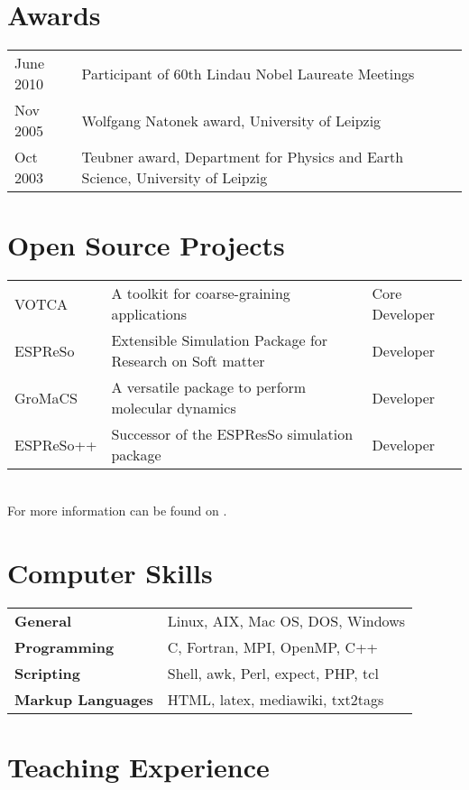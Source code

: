 \documentclass{article}
\begin{document}
\section*{Awards}

\begin{tabular}{ll}
June 2010 & Participant of 60th Lindau Nobel Laureate Meetings\\
Nov 2005  & Wolfgang Natonek award, University of Leipzig\\
Oct 2003  & Teubner award, Department for Physics and Earth Science, University of Leipzig\\
\end{tabular}

\section*{Open Source Projects}

\begin{tabular}{p{}p{}p{}}
VOTCA & A toolkit for coarse-graining applications & Core Developer \\
ESPReSo & Extensible Simulation Package for Research on Soft matter & Developer \\
GroMaCS & A versatile package to perform molecular dynamics & Developer \\
ESPReSo++ & Successor of the ESPResSo simulation package & Developer \\
\end{tabular}\\
For more information can be found on .

\section*{Computer Skills}

\begin{tabular}{ll}
\textbf{General} & Linux, AIX, Mac OS, DOS, Windows \\
\textbf{Programming} & C, Fortran, MPI, OpenMP, C++ \\
\textbf{Scripting} & Shell, awk, Perl, expect, PHP, tcl \\
\textbf{Markup Languages} & HTML, latex, mediawiki, txt2tags \\
\end{tabular}

\section*{Teaching Experience}
\end{document}
